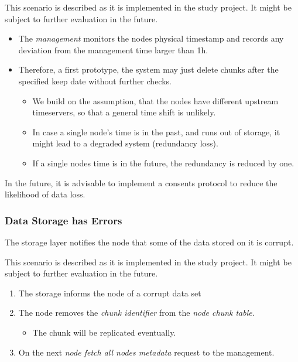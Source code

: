 This scenario is described as it is implemented in the study project. It might be subject to further evaluation in the future.

\begin{itemize}
    \item The \emph{management} monitors the nodes physical timestamp and records any deviation from the management time larger than 1h.
    \item Therefore, a first prototype, the system may just delete chunks after the specified keep date without further checks.
        \begin{itemize}
            \item We build on the assumption, that the nodes have different upstream timeservers, so that a general time shift is unlikely.
            \item In case a single node's time is in the past, and runs out of storage, it might lead to a degraded system (redundancy loss).
            \item If a single nodes time is in the future, the redundancy is reduced by one.
        \end{itemize}
\end{itemize}

In the future, it is advisable to implement a consents protocol to reduce the likelihood of data loss.

\subsubsection{Data Storage has Errors}\label{sec:scenario-storage-errors}
The storage layer notifies the node that some of the data stored on it is corrupt.

This scenario is described as it is implemented in the study project. It might be subject to further evaluation in the future.

\begin{enumerate}
    \item The storage informs the node of a corrupt data set
    \item The node removes the \emph{chunk identifier} from the \emph{node chunk table}.
        \begin{itemize}
            \item The chunk will be replicated eventually.
        \end{itemize}
    \item On the next \emph{node fetch all nodes metadata} request to the management.
\end{enumerate}


